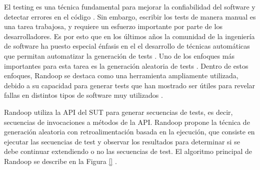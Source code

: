             
            
                
    

El testing es una técnica fundamental para mejorar la confiabilidad del software
y detectar errores en el código \cite{} . 
Sin embargo, escribir los tests de manera manual es una tarea trabajosa, y
requiere un esfuerzo importante por parte de los desarrolladores. Es por esto
que en los últimos años la comunidad de la ingeniería de software ha puesto especial énfasis en el
el desarrollo de técnicas automáticas que permitan automatizar la generación de
tests \cite{} . 
Uno de los enfoques más importantes para esta tarea es la generación aleatoria
de tests \cite{} . 
Dentro de estos enfoques, Randoop se destaca como una herramienta ampliamente
utilizada, debido a su capacidad para generar tests que han mostrado ser útiles para revelar
fallas en distintos tipos de software muy utilizados \cite{} 
.

Randoop utiliza la API del SUT para generar secuencias de tests, es decir,
secuencias de invocaciones a métodos de la API. Randoop propone la técnica
de generación aleatoria con retroalimentación basada en la ejecución, que
consiste en ejecutar las secuencias de test y observar los resultados para 
determinar si se debe continuar extendiendo o no las secuencias de test. 
El algoritmo principal de Randoop se describe en la Figura \ref{} .

